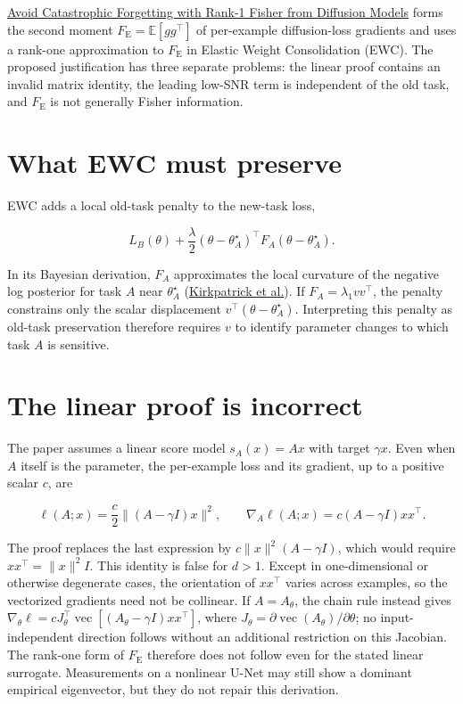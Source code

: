 \documentclass[11pt]{article}
\begin{document}
\href{https://arxiv.org/abs/2509.23593}{Avoid Catastrophic Forgetting with Rank-1 Fisher from Diffusion Models} forms the second moment \(F_{\mathrm E}=\mathbb E[gg^\top]\) of per-example diffusion-loss gradients and uses a rank-one approximation to \(F_{\mathrm E}\) in Elastic Weight Consolidation (EWC). The proposed justification has three separate problems: the linear proof contains an invalid matrix identity, the leading low-SNR term is independent of the old task, and \(F_{\mathrm E}\) is not generally Fisher information.

\section{What EWC must preserve}\label{what-ewc-must-preserve}

EWC adds a local old-task penalty to the new-task loss,

\[
L_B(\theta)+\frac{\lambda}{2}(\theta-\theta_A^\star)^\top F_A(\theta-\theta_A^\star).
\]

In its Bayesian derivation, \(F_A\) approximates the local curvature of the negative log posterior for task \(A\) near \(\theta_A^\star\) (\href{https://arxiv.org/abs/1612.00796}{Kirkpatrick et al.}). If \(F_A=\lambda_1vv^\top\), the penalty constrains only the scalar displacement \(v^\top(\theta-\theta_A^\star)\). Interpreting this penalty as old-task preservation therefore requires \(v\) to identify parameter changes to which task \(A\) is sensitive.

\section{The linear proof is incorrect}\label{the-linear-proof-is-incorrect}

The paper assumes a linear score model \(s_A(x)=Ax\) with target \(\gamma x\). Even when \(A\) itself is the parameter, the per-example loss and its gradient, up to a positive scalar \(c\), are

\[
\ell(A;x)=\frac{c}{2}\lVert(A-\gamma I)x\rVert^2,
\qquad
\nabla_A\ell(A;x)=c(A-\gamma I)xx^\top.
\]

The proof replaces the last expression by \(c\lVert x\rVert^2(A-\gamma I)\), which would require \(xx^\top=\lVert x\rVert^2I\). This identity is false for \(d>1\). Except in one-dimensional or otherwise degenerate cases, the orientation of \(xx^\top\) varies across examples, so the vectorized gradients need not be collinear. If \(A=A_\theta\), the chain rule instead gives \(\nabla_\theta\ell=cJ_\theta^\top\operatorname{vec}[(A_\theta-\gamma I)xx^\top]\), where \(J_\theta=\partial\operatorname{vec}(A_\theta)/\partial\theta\); no input-independent direction follows without an additional restriction on this Jacobian. The rank-one form of \(F_{\mathrm E}\) therefore does not follow even for the stated linear surrogate. Measurements on a nonlinear U-Net may still show a dominant empirical eigenvector, but they do not repair this derivation.
\end{document}
